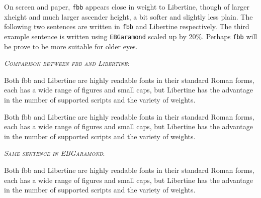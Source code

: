 \documentclass{article}
\begin{document}
On screen and paper, {\tt fbb} appears close in weight to Libertine, though of larger xheight and much larger ascender height, a bit softer and slightly less plain.  The following two sentences are written in {\tt fbb} and Libertine respectively. The third example sentence is written using {\tt EBGaramond} scaled up by 20\%. Perhaps {\tt fbb} will be prove to be more suitable for older eyes.

\textit{\textsc{Comparison between fbb and Libertine}}: 

Both fbb and Libertine are highly readable fonts in their standard Roman forms, each has a wide range of figures and small caps, but Libertine has the advantage in the number of supported scripts and the variety of weights.

{\selectfont Both fbb and Libertine are highly readable fonts in their standard Roman forms, each has a wide range of figures and small caps, but Libertine has the advantage in the number of supported scripts and the variety of weights.}

\textit{\textsc{Same sentence in EBGaramond}}: 

{\fontsize{12}{13}Both fbb and Libertine are highly readable fonts in their standard Roman forms, each has a wide range of figures and small caps, but Libertine has the advantage in the number of supported scripts and the variety of weights.}
\end{document}

